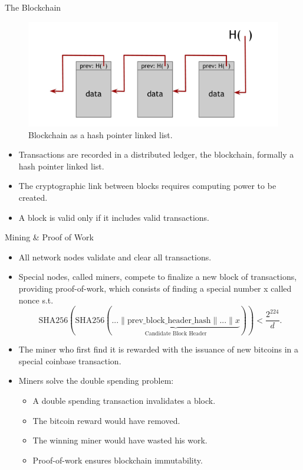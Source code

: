 \documentclass[usenames,dvipsnames]{beamer}
\begin{document}
    \begin{frame}{The Blockchain}
        \begin{figure}
        \centering
        \includegraphics[width=0.7\linewidth]{Images/blockchain.png}
        \caption{Blockchain as a hash pointer linked list.}
        \end{figure}
        \begin{itemize}
            \item Transactions are recorded in a \alert{distributed ledger}, the \alert{blockchain}, formally a hash pointer linked list.
            \item The \alert{cryptographic link} between blocks requires computing power to be created.
            \item A block is \alert{valid} only if it includes valid transactions.
        \end{itemize} 
    \end{frame}

    \begin{frame}{Mining \& Proof of Work}
        \begin{itemize}
            \item All network nodes \alert{validate} and \alert{clear} all transactions.
            \item Special nodes, called \alert{miners}, compete to finalize a new block of transactions, providing \alert{proof-of-work}, which consists of finding a special number \alert{x} called \alert{nonce} s.t.
            $$\text{SHA256}(\text{SHA256}(\underbrace{... \| \text{prev\_block\_header\_hash} \| ... \| x}_{\text{Candidate Block Header}})) < \frac{2^{224}}{d}.$$
            \item The miner who \alert{first} find it is rewarded with the issuance of new bitcoins in a special \alert{coinbase} transaction.
            \item Miners solve the \alert{double spending problem}:
            \begin{itemize}
                \item A double spending transaction invalidates a block.
                \item The bitcoin reward would have removed.
                \item The winning miner would have wasted his work.
                \item Proof-of-work ensures \alert{blockchain immutability}.
            \end{itemize}
        \end{itemize}    
    \end{frame}
    
\end{document}
